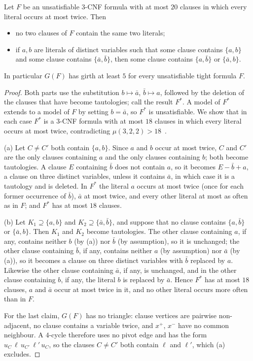\documentclass[11pt]{article}
\theoremstyle{remark}\newtheorem{remark}[theorem]{Remark}
\begin{document}
\begin{lemma}\label{girth}
Let $F$ be an unsatisfiable $3$-CNF formula with at most $20$ clauses in which every literal occurs at most twice. Then
\begin{itemize}
\item[(a)] no two clauses of $F$ contain the same two literals;
\item[(b)] if $a,b$ are literals of distinct variables such that some clause contains $\{a,b\}$ and some clause contains $\{\bar a,\bar b\}$, then some clause contains $\{a,\bar b\}$ or $\{\bar a,b\}$.
\end{itemize}
In particular $G(F)$ has girth at least $5$ for every unsatisfiable tight formula $F$.
\end{lemma}
\begin{proof}
Both parts use the substitution $b\mapsto\bar a$, $\bar b\mapsto a$, followed by the deletion of the clauses that have become tautologies; call the result $F^*$. A model of $F^*$ extends to a model of $F$ by setting $b=\bar a$, so $F^*$ is unsatisfiable. We show that in each case $F^*$ is a $3$-CNF formula with at most $18$ clauses in which every literal occurs at most twice, contradicting $\mu(3,2,2)>18$~\cite[Thm.~15]{ZPS}.

(a) Let $C\ne C'$ both contain $\{a,b\}$. Since $a$ and $b$ occur at most twice, $C$ and $C'$ are the only clauses containing $a$ and the only clauses containing $b$; both become tautologies. A clause $E$ containing $\bar b$ does not contain $a$, so it becomes $E-\bar b+a$, a clause on three distinct variables, unless it contains $\bar a$, in which case it is a tautology and is deleted. In $F^*$ the literal $a$ occurs at most twice (once for each former occurrence of $\bar b$), $\bar a$ at most twice, and every other literal at most as often as in $F$; and $F^*$ has at most $18$ clauses.

(b) Let $K_1\supseteq\{a,b\}$ and $K_2\supseteq\{\bar a,\bar b\}$, and suppose that no clause contains $\{a,\bar b\}$ or $\{\bar a,b\}$. Then $K_1$ and $K_2$ become tautologies. The other clause containing $a$, if any, contains neither $b$ (by (a)) nor $\bar b$ (by assumption), so it is unchanged; the other clause containing $\bar b$, if any, contains neither $a$ (by assumption) nor $\bar a$ (by (a)), so it becomes a clause on three distinct variables with $\bar b$ replaced by $a$. Likewise the other clause containing $\bar a$, if any, is unchanged, and in the other clause containing $b$, if any, the literal $b$ is replaced by $\bar a$. Hence $F^*$ has at most $18$ clauses, $a$ and $\bar a$ occur at most twice in it, and no other literal occurs more often than in $F$.

For the last claim, $G(F)$ has no triangle: clause vertices are pairwise non-adjacent, no clause contains a variable twice, and $x^+$, $x^-$ have no common neighbour. A $4$-cycle therefore uses no pivot edge and has the form $u_C\,\ell\,u_{C'}\,\ell'\,u_C$, so the clauses $C\ne C'$ both contain $\ell$ and $\ell'$, which (a) excludes.
\end{proof}
\end{document}
